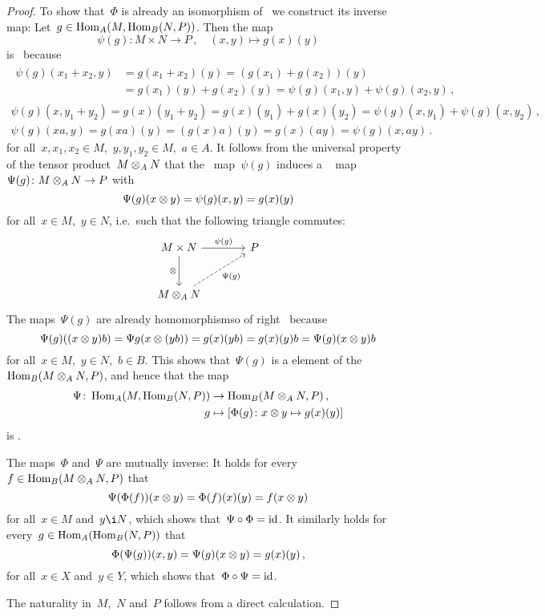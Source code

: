 \begin{proof}
  To show that~$\Phi$ is already an isomorphism of~{\modules{$\kf$}} we construct its inverse map:
  Let~$g \in \operatorname{Hom}_A(M, \operatorname{Hom}_B(N,P))$.
  Then the map
  \[
            \psi(g)
    \colon  M \times N
    \to     P \,,
    \quad   (x,y)
    \mapsto g(x)(y)
  \]
  is~{} because
  \begin{gather*}
    \begin{aligned}
          \psi(g)(x_1 + x_2, y)
      &=  g(x_1 + x_2)(y)
       =  (g(x_1) + g(x_2))(y)  \\
      &=  g(x_1)(y) + g(x_2)(y)
       =  \psi(g)(x_1,y) + \psi(g)(x_2,y) \,,
    \end{aligned}
  \\
      \psi(g)(x, y_1 + y_2)
    = g(x)(y_1 + y_2)
    = g(x)(y_1) + g(x)(y_2)
    = \psi(g)(x, y_1) + \psi(g)(x, y_2) \,,
  \\
      \psi(g)(xa, y)
    = g(xa)(y)
    = (g(x)a)(y)
    = g(x)(ay)
    = \psi(g)(x,ay) \,.
  \end{gather*}
  for all~$x, x_1, x_2 \in M$,~$y, y_1, y_2 \in M$,~$a \in A$.
  It follows from the universal property of the tensor product~$M \otimes_A N$ that the~{} map~$\psi(g)$ induces a {\welldef}~{\klin} map~$\Psi(g) \colon M \otimes_A N \to P$ with
  \[
      \Psi(g)(x \otimes y)
    = \psi(g)(x, y)
    = g(x)(y)
  \]
  for all~$x \in M$,~$y \in N$, i.e.\ such that the following triangle commutes:
  \[
    \begin{tikzcd}[sep = large]
        M \times N
        \arrow{r}[above]{\psi(g)}
        \arrow{d}[left]{\tensor}
      & P
      \\
        M \tensor_A N
        \arrow[dashed]{ur}[below right]{\Psi(g)}
      & {}
    \end{tikzcd}
  \]
  The maps~$\Psi(g)$ are already homomorphismso of right~{} because
  \[
      \Psi(g)((x \otimes y) b)
    = \Psi{g}(x \otimes (yb))
    = g(x)(yb)
    = g(x)(y) b
    = \Psi(g)(x \otimes y) b
  \]
  for all~$x \in M$,~$y \in N$,~$b \in B$.
  This shows that~$\Psi(g)$ is a {\welldef} element of the~{\module{$\kf$}}~$\operatorname{Hom}_B(M \otimes_A N, P)$, and hence that the map
  \begin{align*}
              \Psi
     \colon   \operatorname{Hom}_A(M, \operatorname{Hom}_B(N,P))
    &\to      \operatorname{Hom}_B(M \otimes_A N, P) \,, \\
              g
    &\mapsto  \left[
                        \Phi(g)
                \colon  x \otimes y
                \mapsto g(x)(y)
              \right]
  \end{align*}
  is {\welldef}.
  
  The maps~$\Phi$ and~$\Psi$ are mutually inverse:
  It holds for every~$f \in \operatorname{Hom}_B(M \otimes_A N, P)$ that
  \[
      \Psi(\Phi(f))(x \otimes y)
    = \Phi(f)(x)(y)
    = f(x \otimes y)
  \]
  for all~$x \in M$ and~$y \i N$, which shows that~$\Psi \circ \Phi = \operatorname{id}$.
  It similarly holds for every~$g \in \operatorname{Hom}_A(\operatorname{Hom}_B(N, P))$ that
  \[
      \Phi(\Psi(g))(x,y)
    = \Psi(g)(x \otimes y)
    = g(x)(y) \,,
  \]
  for all~$x \in X$ and~$y \in Y$, which shows that~$\Phi \circ \Psi = \operatorname{id}$.
  
  The naturality in~$M$,~$N$ and~$P$ follows from a direct calculation.
\end{proof}





